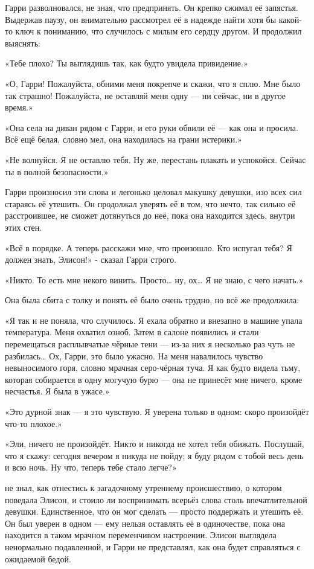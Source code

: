 \documentclass[a4paper,12pt]{book}
\begin{document}
\par
Гарри разволновался, не зная, что предпринять. Он крепко сжимал её запястья. Выдержав паузу, он внимательно рассмотрел её в надежде найти хотя бы какой-то ключ к пониманию, что случилось с милым его сердцу другом. И продолжил выяснять:
\par
«Тебе плохо? Ты выглядишь так, как будто увидела привидение.»
\par
«О, Гарри! Пожалуйста, обними меня покрепче и скажи, что я сплю. Мне было так страшно! Пожалуйста, не оставляй меня одну — ни сейчас, ни в другое время.»
\par
«Она села на диван рядом с Гарри, и его руки обвили её — как она и просила. Всё ещё белая, словно мел, она находилась на грани истерики.»
\par
«Не волнуйся. Я не оставлю тебя. Ну же, перестань плакать и успокойся. Сейчас ты в полной безопасности.»
\par
Гарри произносил эти слова и легонько целовал макушку девушки, изо всех сил стараясь её утешить. Он продолжал уверять её в том, что нечто, так сильно её расстроившее, не сможет дотянуться до неё, пока она находится здесь, внутри этих стен.
\par
«Всё в порядке. А теперь расскажи мне, что произошло. Кто испугал тебя? Я должен знать, Элисон!» - сказал Гарри строго.
\par
«Никто. То есть мне некого винить. Просто… ну, ох… Я не знаю, с чего начать.»
\par
Она была сбита с толку и понять её было очень трудно, но всё же продолжила:
\par
«Я так и не поняла, что случилось. Я ехала обратно и внезапно в машине упала температура. Меня охватил озноб. Затем в салоне появились и стали перемещаться расплывчатые чёрные тени — из-за них я несколько раз чуть не разбилась… Ох, Гарри, это было ужасно. На меня навалилось чувство невыносимого горя, словно мрачная серо-чёрная туча. Я как будто видела тьму, которая собирается в одну могучую бурю — она не принесёт мне ничего, кроме несчастья. Я была в ужасе.»
\par
«Это дурной знак — я это чувствую. Я уверена только в одном: скоро произойдёт что-то плохое.»
\par
«Эли, ничего не произойдёт. Никто и никогда не хотел тебя обижать. Послушай, что я скажу: сегодня вечером я никуда не пойду; я буду рядом с тобой весь день и всю ночь. Ну что, теперь тебе стало легче?»\\
\par
{} не знал, как отнестись к загадочному утреннему происшествию, о котором поведала Элисон, и стоило ли воспринимать всерьёз слова столь впечатлительной девушки. Единственное, что он мог сделать — просто поддержать и утешить её. Он был уверен в одном — ему нельзя оставлять её в одиночестве, пока она находится в таком мрачном переменчивом настроении. Элисон выглядела ненормально подавленной, и Гарри не представлял, как она будет справляться с ожидаемой бедой.
\end{document}
